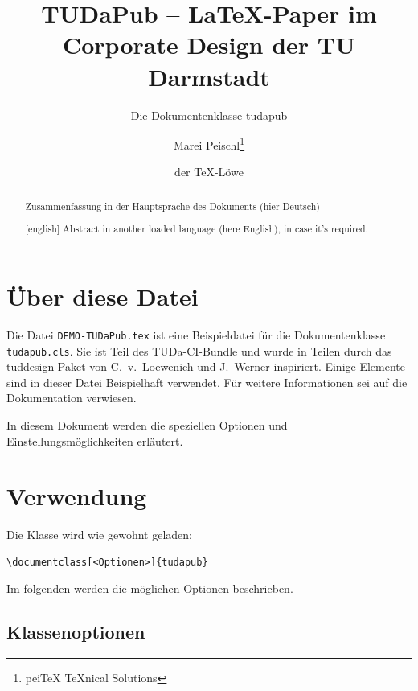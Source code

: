 \documentclass[
	ngerman,%
	accentcolor=9c,%
]{tudapub}
\title{TUDaPub -- \LaTeX-Paper im Corporate Design der TU Darmstadt}
\subtitle{Die Dokumentenklasse tudapub}
\author{Marei Peischl\thanks{pei\TeX{} \TeX{}nical Solutions}\and der \TeX-Löwe}
\newcommand*{\file}[1]{\texttt{#1}}
\begin{document}
\maketitle

\begin{abstract}
	Zusammenfassung in der Hauptsprache des Dokuments (hier Deutsch)
\end{abstract}

\begin{abstract}[english]
	Abstract in another loaded language (here English), in case it's required.
\end{abstract}

\tableofcontents


\section{Über diese Datei}

Die Datei \file{DEMO-TUDaPub.tex} ist eine Beispieldatei für die Dokumentenklasse \file{tudapub.cls}.
Sie ist Teil des TUDa-CI-Bundle und wurde in Teilen durch das tuddesign-Paket von C.~v.~Loewenich und J.~Werner inspiriert.
Einige Elemente sind in dieser Datei Beispielhaft verwendet. Für weitere Informationen sei auf die Dokumentation \cite{tuda-ci} verwiesen.


In diesem Dokument werden die speziellen Optionen und Einstellungsmöglichkeiten erläutert.

\section{Verwendung}
Die Klasse wird wie gewohnt geladen:
\begin{verbatim}
\documentclass[<Optionen>]{tudapub}
\end{verbatim}
Im folgenden werden die möglichen Optionen beschrieben.

\subsection{Klassenoptionen}
\end{document}
